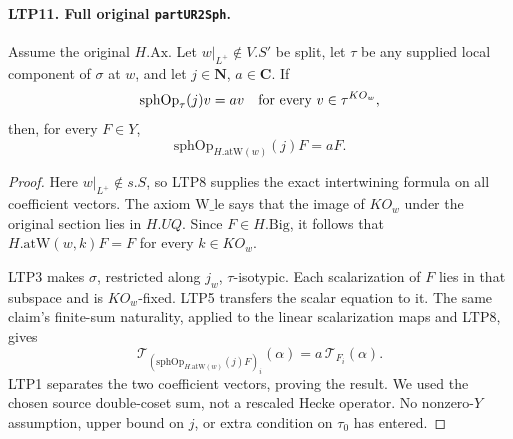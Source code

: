 \documentclass[11pt,a4paper]{article}
\numberwithin{equation}{section}
\theoremstyle{remark}\newtheorem{remark}[theorem]{Remark}
\begin{document}
\paragraph{LTP11. Full original \texttt{part\allowbreak UR2Sph}.}
\label{claim:LTP11}
Assume the original \(H.\mathrm{Ax}\).
Let \(w|_{L^+}\notin V.S'\) be split, let \(\tau\) be any
supplied local component of \(\sigma\) at \(w\), and let
\(j\in\mathbf N\), \(a\in\mathbf C\).  If
\[
       \mathrm{sphOp}_\tau(j)v=av
                      \quad\hbox{for every }v\in\tau^{KO_w},
\]
then, for every \(F\in Y\),
\[
                \mathrm{sphOp}_{H.\mathrm{atW}(w)}(j)F=aF .
\]
\begin{proof}
Here \(w|_{L^+}\notin s.S\), so LTP8 supplies the exact
intertwining formula on all coefficient vectors.  The axiom
\(\mathrm{W\_\allowbreak le}\) says that the image of \(KO_w\) under the
original section lies in \(H.UQ\).  Since \(F\in H.\mathrm{Big}\),
it follows that \(H.\mathrm{atW}(w,k)F=F\) for every \(k\in KO_w\).

LTP3 makes \(\sigma\), restricted along \(j_w\), \(\tau\)-isotypic.
Each scalarization of \(F\) lies in that subspace and is \(KO_w\)-fixed.
LTP5 transfers the scalar equation to it.  The same claim's
finite-sum naturality, applied to the linear scalarization maps
and LTP8, gives
\[
 \mathcal T_{(\mathrm{sphOp}_{H.\mathrm{atW}(w)}(j)F)_i}(\alpha)
                          =a\,\mathcal T_{F_i}(\alpha).
\]
LTP1 separates the two coefficient vectors, proving the result.
We used the chosen source double-coset sum, not a rescaled
Hecke operator.  No nonzero-\(Y\) assumption, upper bound on \(j\),
or extra condition on \(\tau_0\) has entered.
\end{proof}

\end{document}

